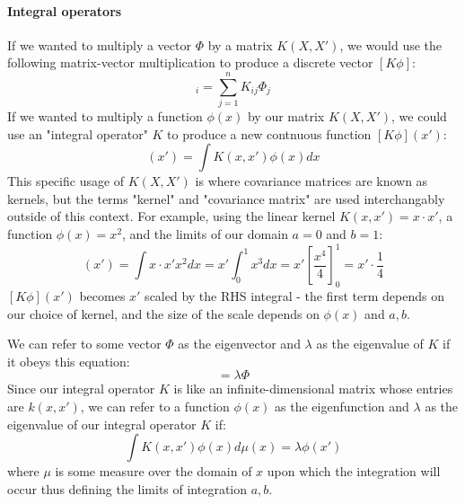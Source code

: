 \paragraph{Integral operators}
If we wanted to multiply a vector $\Phi$ by a matrix $K(X,X')$, we would use the following matrix-vector multiplication to produce a discrete vector $[K \phi]$:
\begin{equation*}
    [K \phi]_i = \sum_{j=1}^{n} K_{ij} \Phi_j
\end{equation*}
If we wanted to multiply a function $\phi(x)$ by our matrix $K(X,X')$, we could use an "integral operator" $K$ to produce a new contnuous function $[K\phi](x')$:
\begin{equation*}
    [K\phi](x') = \int K(x, x') \phi(x) dx
\end{equation*}
This specific usage of $K(X,X')$ is where covariance matrices are known as kernels, but the terms "kernel" and "covariance matrix" are used interchangably outside of this context. For example, using the linear kernel $K(x, x') = x \cdot x'$, a function $\phi(x) = x^2$, and the limits of our domain $a = 0$ and $b = 1$:
\begin{equation*}
    [K\phi](x') = \int x \cdot x' x^2 dx = x' \int_0^1 x^3 dx = x' [ \frac{x^4}{4} ]_0^1 = x' \cdot \frac{1}{4}
\end{equation*}
$[K\phi](x')$ becomes $x'$ scaled by the RHS integral - the first term depends on our choice of kernel, and the size of the scale depends on $\phi(x)$ and $a, b$.

We can refer to some vector $\Phi$ as the eigenvector and $\lambda$ as the eigenvalue of $K$ if it obeys this equation:
\begin{equation*}
    [K \Phi] = \lambda \Phi
\end{equation*}
Since our integral operator $K$ is like an infinite-dimensional matrix whose entries are $k(x, x')$, we can refer to a function $\phi(x)$ as the eigenfunction and $\lambda$ as the eigenvalue of our integral operator $K$ if:
\begin{equation*}
    \int K(x, x') \phi(x) d\mu(x) = \lambda \phi(x')
\end{equation*}
where $\mu$ is some measure over the domain of $x$ upon which the integration will occur thus defining the limits of integration $a, b$. 

